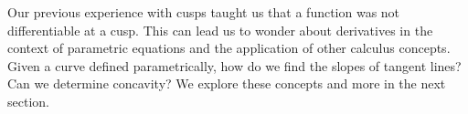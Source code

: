 Our previous experience with cusps taught us that a function was not differentiable at a cusp. This can lead us to wonder about derivatives in the context of parametric equations and the application of other calculus concepts. Given a curve defined parametrically, how do we find the slopes of tangent lines? Can we determine concavity? We explore these concepts and more in the next section.


